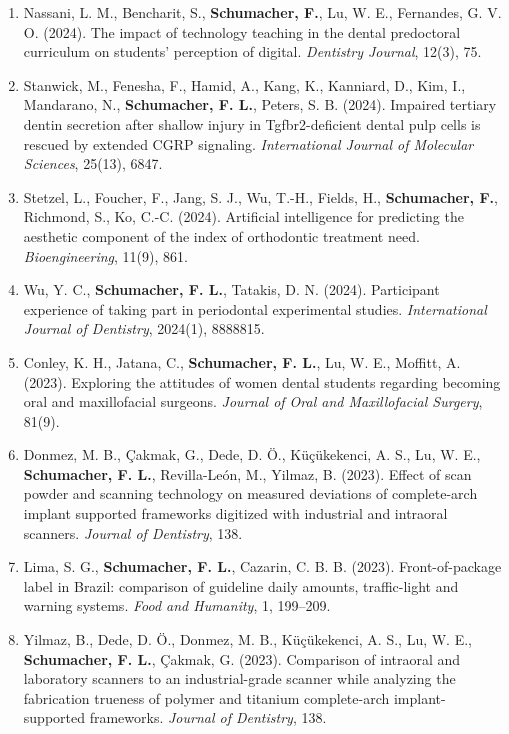 \documentclass[
  10pt,
  letterpaper,
]{article}
\begin{document}
\begin{enumerate}
\item
  Nassani, L. M., Bencharit, S., \textbf{Schumacher, F.}, Lu, W. E.,
  Fernandes, G. V. O. (2024). The impact of technology teaching in the
  dental predoctoral curriculum on students' perception of digital.
  \emph{Dentistry Journal}, 12(3), 75.
\item
  Stanwick, M., Fenesha, F., Hamid, A., Kang, K., Kanniard, D., Kim, I.,
  Mandarano, N., \textbf{Schumacher, F. L.}, Peters, S. B. (2024).
  Impaired tertiary dentin secretion after shallow injury in
  Tgfbr2-deficient dental pulp cells is rescued by extended CGRP
  signaling. \emph{International Journal of Molecular Sciences}, 25(13),
  6847.
\item
  Stetzel, L., Foucher, F., Jang, S. J., Wu, T.-H., Fields, H.,
  \textbf{Schumacher, F.}, Richmond, S., Ko, C.-C. (2024). Artificial
  intelligence for predicting the aesthetic component of the index of
  orthodontic treatment need. \emph{Bioengineering}, 11(9), 861.
\item
  Wu, Y. C., \textbf{Schumacher, F. L.}, Tatakis, D. N. (2024).
  Participant experience of taking part in periodontal experimental
  studies. \emph{International Journal of Dentistry}, 2024(1), 8888815.
\item
  Conley, K. H., Jatana, C., \textbf{Schumacher, F. L.}, Lu, W. E.,
  Moffitt, A. (2023). Exploring the attitudes of women dental students
  regarding becoming oral and maxillofacial surgeons. \emph{Journal of
  Oral and Maxillofacial Surgery}, 81(9).
\item
  Donmez, M. B., Çakmak, G., Dede, D. Ö., Küçükekenci, A. S., Lu, W. E.,
  \textbf{Schumacher, F. L.}, Revilla-León, M., Yilmaz, B. (2023).
  Effect of scan powder and scanning technology on measured deviations
  of complete-arch implant supported frameworks digitized with
  industrial and intraoral scanners. \emph{Journal of Dentistry}, 138.
\item
  Lima, S. G., \textbf{Schumacher, F. L.}, Cazarin, C. B. B. (2023).
  Front-of-package label in Brazil: comparison of guideline daily
  amounts, traffic-light and warning systems. \emph{Food and Humanity},
  1, 199--209.
\item
  Yilmaz, B., Dede, D. Ö., Donmez, M. B., Küçükekenci, A. S., Lu, W. E.,
  \textbf{Schumacher, F. L.}, Çakmak, G. (2023). Comparison of intraoral
  and laboratory scanners to an industrial-grade scanner while analyzing
  the fabrication trueness of polymer and titanium complete-arch
  implant-supported frameworks. \emph{Journal of Dentistry}, 138.
\end{enumerate}
\end{document}
